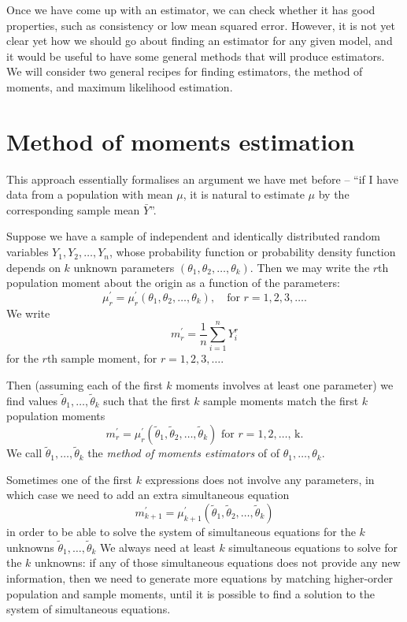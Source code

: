 \documentclass[]{book}
\theoremstyle{definition}
\theoremstyle{definition}
\theoremstyle{definition}
\theoremstyle{remark}
\begin{document}
Once we have come up with an estimator, we can check whether it has good
properties, such as consistency or low mean squared error. However, it
is not yet clear yet how we should go about finding an estimator for any
given model, and it would be useful to have some general methods that
will produce estimators. We will consider two general recipes for
finding estimators, the method of moments, and maximum likelihood
estimation.

\section{Method of moments
estimation}\label{method-of-moments-estimation}

This approach essentially formalises an argument we have met before --
``if I have data from a population with mean \(\mu\), it is natural to
estimate \(\mu\) by the corresponding sample mean \(\bar Y\)''.

Suppose we have a sample of independent and identically distributed
random variables \(Y_1, Y_2, \ldots,Y_n\), whose probability function or
probability density function depends on \(k\) unknown parameters
\((\theta_1, \theta_2, \ldots, \theta_k)\). Then we may write the
\(r\)th population moment about the origin as a function of the
parameters:
\[\mu_r^\prime = \mu_r^\prime(\theta_1, \theta_2, \ldots, \theta_k), \quad \text{for $r = 1, 2, 3, \ldots$.}\]
We write \[m_r^\prime = \frac{1}{n} \sum_{i=1}^n Y_i^r\] for the \(r\)th
sample moment, for \(r = 1, 2, 3, \ldots\).

Then (assuming each of the first \(k\) moments involves at least one
parameter) we find values \(\tilde \theta_1, \ldots, \tilde \theta_k\)
such that the first \(k\) sample moments match the first \(k\)
population moments
\[m_r^\prime = \mu_r^\prime(\tilde \theta_1, \tilde \theta_2, \ldots, \tilde \theta_k) \text{ for $r = 1, 2, \ldots$, k}.\]
We call \(\tilde \theta_1, \ldots, \tilde \theta_k\) the \emph{method of
moments estimators} of of \(\theta_1, \ldots, \theta_k\).

Sometimes one of the first \(k\) expressions does not involve any
parameters, in which case we need to add an extra simultaneous equation
\[m_{k+1}^\prime = \mu_{k+1}^\prime(\tilde \theta_1, \tilde \theta_2, \ldots, \tilde \theta_k)\]
in order to be able to solve the system of simultaneous equations for
the \(k\) unknowns \(\tilde \theta_1, \ldots, \tilde \theta_k\) We
always need at least \(k\) simultaneous equations to solve for the \(k\)
unknowns: if any of those simultaneous equations does not provide any
new information, then we need to generate more equations by matching
higher-order population and sample moments, until it is possible to find
a solution to the system of simultaneous equations.
\end{document}
